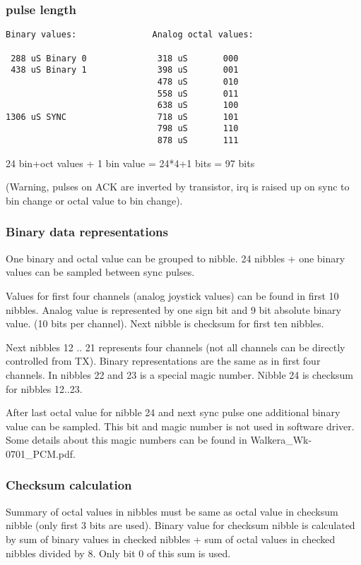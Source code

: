 \documentclass[a4paper,8pt,english]{sphinxmanual}
\begin{document}
\subsubsection{pulse length}
\label{input/devices/walkera0701:pulse-length}
\begin{Verbatim}[commandchars=\\\{\}]
 Binary values:               Analog octal values:

 288 uS Binary 0              318 uS       000
 438 uS Binary 1              398 uS       001
                              478 uS       010
                              558 uS       011
                              638 uS       100
1306 uS SYNC                  718 uS       101
                              798 uS       110
                              878 uS       111
\end{Verbatim}

24 bin+oct values + 1 bin value = 24*4+1 bits  = 97 bits

(Warning, pulses on ACK are inverted by transistor, irq is raised up on sync
to bin change or octal value to bin change).


\subsubsection{Binary data representations}
\label{input/devices/walkera0701:binary-data-representations}
One binary and octal value can be grouped to nibble. 24 nibbles + one binary
values can be sampled between sync pulses.

Values for first four channels (analog joystick values) can be found in
first 10 nibbles. Analog value is represented by one sign bit and 9 bit
absolute binary value. (10 bits per channel). Next nibble is checksum for
first ten nibbles.

Next nibbles 12 .. 21 represents four channels (not all channels can be
directly controlled from TX). Binary representations are the same as in first
four channels. In nibbles 22 and 23 is a special magic number. Nibble 24 is
checksum for nibbles 12..23.

After last octal value for nibble 24 and next sync pulse one additional
binary value can be sampled. This bit and magic number is not used in
software driver. Some details about this magic numbers can be found in
Walkera\_Wk-0701\_PCM.pdf.


\subsubsection{Checksum calculation}
\label{input/devices/walkera0701:checksum-calculation}
Summary of octal values in nibbles must be same as octal value in checksum
nibble (only first 3 bits are used). Binary value for checksum nibble is
calculated by sum of binary values in checked nibbles + sum of octal values
in checked nibbles divided by 8. Only bit 0 of this sum is used.
\end{document}
